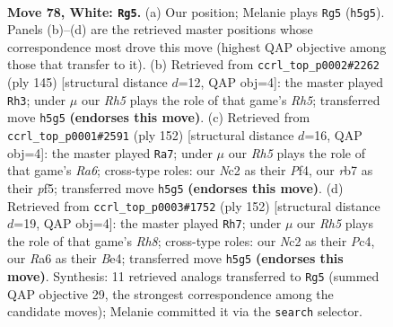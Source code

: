\documentclass[11pt]{article}
\begin{document}
\clearpage

\begin{figure}[p]\centering
\begin{subfigure}{0.46\textwidth}\centering
\resizebox{\linewidth}{!}{%
\newchessgame
\chessboard[
  setfen={6k1/1r4b1/R7/7R/2P5/8/2N3K1/8 w - - 76 78},
  showmover=false,
  pgfstyle=straightmove, color=movearrow, markmove={h5-g5}
]}
\caption{}
\end{subfigure}\hfill
\begin{subfigure}{0.46\textwidth}\centering
\resizebox{\linewidth}{!}{%
\newchessgame
\chessboard[
  setfen={8/8/8/1n2k3/7r/3KB3/R7/8 b - - 0 73},
  showmover=false,
  pgfstyle=straightmove, color=movearrow, markmove={h4-h3}
]}
\caption{}
\end{subfigure}
\\[4pt]
\begin{subfigure}{0.46\textwidth}\centering
\resizebox{\linewidth}{!}{%
\newchessgame
\chessboard[
  setfen={8/4bk2/R7/5p1K/5P2/8/8/8 w - - 46 77},
  showmover=false,
  pgfstyle=straightmove, color=movearrow, markmove={a6-a7}
]}
\caption{}
\end{subfigure}\hfill
\begin{subfigure}{0.46\textwidth}\centering
\resizebox{\linewidth}{!}{%
\newchessgame
\chessboard[
  setfen={7R/2kb4/r7/2K5/2P1B3/8/8/8 w - - 26 77},
  showmover=false,
  pgfstyle=straightmove, color=movearrow, markmove={h8-h7}
]}
\caption{}
\end{subfigure}
\caption{\textbf{Move 78, White: \texttt{Rg5}.} (a) Our position; Melanie plays \texttt{Rg5} (\texttt{h5g5}). Panels (b)--(d) are the retrieved master positions whose correspondence most drove this move (highest QAP objective among those that transfer to it). (b) Retrieved from \texttt{ccrl\_top\_p0002\#2262} (ply 145) [structural distance $d$=12, QAP obj=4]: the master played \texttt{Rh3}; under $\mu$ our \emph{Rh5} plays the role of that game's \emph{Rh5}; transferred move \texttt{h5g5} \textbf{(endorses this move)}. (c) Retrieved from \texttt{ccrl\_top\_p0001\#2591} (ply 152) [structural distance $d$=16, QAP obj=4]: the master played \texttt{Ra7}; under $\mu$ our \emph{Rh5} plays the role of that game's \emph{Ra6}; cross-type roles: our \emph{N}c2 as their \emph{P}f4, our \emph{r}b7 as their \emph{p}f5; transferred move \texttt{h5g5} \textbf{(endorses this move)}. (d) Retrieved from \texttt{ccrl\_top\_p0003\#1752} (ply 152) [structural distance $d$=19, QAP obj=4]: the master played \texttt{Rh7}; under $\mu$ our \emph{Rh5} plays the role of that game's \emph{Rh8}; cross-type roles: our \emph{N}c2 as their \emph{P}c4, our \emph{R}a6 as their \emph{B}e4; transferred move \texttt{h5g5} \textbf{(endorses this move)}. Synthesis: 11 retrieved analogs transferred to \texttt{Rg5} (summed QAP objective 29, the strongest correspondence among the candidate moves); Melanie committed it via the \texttt{search} selector.}
\label{fig:thought-m154}
\end{figure}
\end{document}
